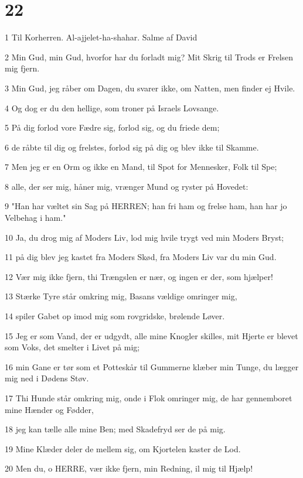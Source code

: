 \chapter{22}

\par 1 Til Korherren. Al-ajjelet-ha-shahar. Salme af David
\par 2 Min Gud, min Gud, hvorfor har du forladt mig? Mit Skrig til Trods er Frelsen mig fjern.
\par 3 Min Gud, jeg råber om Dagen, du svarer ikke, om Natten, men finder ej Hvile.
\par 4 Og dog er du den hellige, som troner på Israels Lovsange.
\par 5 På dig forlod vore Fædre sig, forlod sig, og du friede dem;
\par 6 de råbte til dig og frelstes, forlod sig på dig og blev ikke til Skamme.
\par 7 Men jeg er en Orm og ikke en Mand, til Spot for Mennesker, Folk til Spe;
\par 8 alle, der ser mig, håner mig, vrænger Mund og ryster på Hovedet:
\par 9 "Han har væltet sin Sag på HERREN; han fri ham og frelse ham, han har jo Velbehag i ham."
\par 10 Ja, du drog mig af Moders Liv, lod mig hvile trygt ved min Moders Bryst;
\par 11 på dig blev jeg kastet fra Moders Skød, fra Moders Liv var du min Gud.
\par 12 Vær mig ikke fjern, thi Trængslen er nær, og ingen er der, som hjælper!
\par 13 Stærke Tyre står omkring mig, Basans vældige omringer mig,
\par 14 spiler Gabet op imod mig som rovgridske, brølende Løver.
\par 15 Jeg er som Vand, der er udgydt, alle mine Knogler skilles, mit Hjerte er blevet som Voks, det smelter i Livet på mig;
\par 16 min Gane er tør som et Potteskår til Gummerne klæber min Tunge, du lægger mig ned i Dødens Støv.
\par 17 Thi Hunde står omkring mig, onde i Flok omringer mig, de har gennemboret mine Hænder og Fødder,
\par 18 jeg kan tælle alle mine Ben; med Skadefryd ser de på mig.
\par 19 Mine Klæder deler de mellem sig, om Kjortelen kaster de Lod.
\par 20 Men du, o HERRE, vær ikke fjern, min Redning, il mig til Hjælp!
